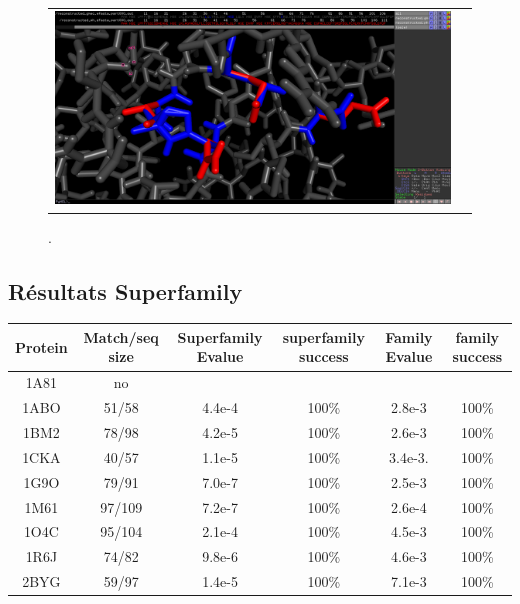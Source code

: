 \documentclass[a4paper,12pt]{article}
\begin{document}
    
    \clearpage

    \clearpage
    
    \begin{figure}[h]
      \centering
      \begin{tabular}{cc} 
        \includegraphics[width=20cm]{image/gmec_vs_ph2.png} &
      \end{tabular}
      
      \caption{.}
      \label{temps_CPU}
    \end{figure}
    
    
    \clearpage



   \subsection{ Résultats Superfamily}


    \begin{table}[h]
           \raggedleft

      \begin{tabular}{|c|c|c|c|c|c|}

        \hline
        Protein & Match/seq size & Superfamily Evalue & superfamily success & Family Evalue & family success\\
        \hline
        1A81 & no & & & & \\
        1ABO & 51/58 & 4.4e-4 & 100\% & 2.8e-3 & 100\% \\
        1BM2 & 78/98 & 4.2e-5 & 100\% & 2.6e-3 & 100\% \\
        1CKA & 40/57 & 1.1e-5 & 100\% & 3.4e-3. & 100\% \\
        1G9O & 79/91 & 7.0e-7 & 100\% & 2.5e-3 & 100\%  \\
        1M61 & 97/109 & 7.2e-7 & 100\% & 2.6e-4 &  100\% \\
        1O4C & 95/104 & 2.1e-4 & 100\% & 4.5e-3 &  100\% \\
        1R6J & 74/82 & 9.8e-6 & 100\% & 4.6e-3 &  100\% \\
        2BYG & 59/97 & 1.4e-5 & 100\% & 7.1e-3 &  100\% \\

        \hline


 \end{tabular}      


 \label{tab_echec2BYG__1}       
\end{table}
\end{document}
